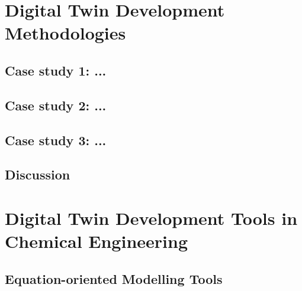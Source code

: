 


\section{Digital Twin Development Methodologies}

\subsection{Case study 1: ...}

\subsection{Case study 2: ...}

\subsection{Case study 3: ...}

\subsection{Discussion}



\section{Digital Twin Development Tools in Chemical Engineering}


\subsection{Equation-oriented Modelling Tools}








